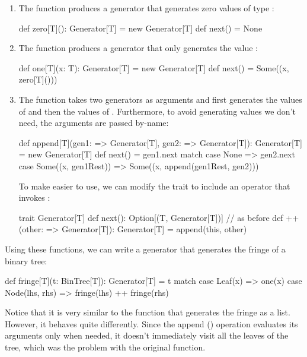 \begin{enumerate}

  \item The function  produces a generator that generates zero values of type :

  \begin{scalacode}
  def zero[T](): Generator[T] = new Generator[T] { def next() = None }
  \end{scalacode}

  \item The function  produces a generator that only generates the value :

  \begin{scalacode}
  def one[T](x: T): Generator[T] = new Generator[T] { def next() = Some((x, zero[T]())) }
  \end{scalacode}

  \item The function  takes two generators as arguments and first generates the
  values of  and then the values of . Furthermore, to avoid generating values
  we don't need, the arguments are passed by-name:

\begin{scalacode}
def append[T](gen1: => Generator[T], gen2: => Generator[T]): Generator[T] = new Generator[T] { 
  def next() = gen1.next match {
    case None => gen2.next
    case Some((x, gen1Rest)) => Some((x, append(gen1Rest, gen2)))
  }
}
\end{scalacode}

To make  easier to use, we can modify the  trait to include an operator
that invokes :
\begin{scalacode}
trait Generator[T] {
  def next(): Option[(T, Generator[T])] // as before
  def ++(other: => Generator[T]): Generator[T] = append(this, other)
}
\end{scalacode}

\end{enumerate}

Using these functions, we can write a generator that generates the fringe of a binary tree:
%
\begin{scalacode}
def fringe[T](t: BinTree[T]): Generator[T] = t match {
  case Leaf(x) => one(x)
  case Node(lhs, rhs) => fringe(lhs) ++ fringe(rhs)
}
\end{scalacode}
%
Notice that it is very similar to the function that generates the fringe as a list. However, it behaves quite differently.
Since the append (\scalainline{++}) operation evaluates its arguments only when needed, it doesn't immediately visit all the
leaves of the tree, which was the problem with the original function.

